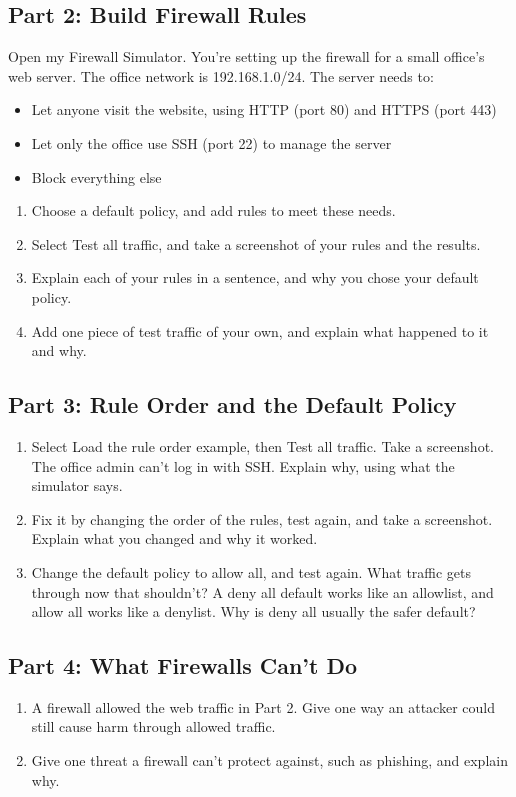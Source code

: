 \documentclass[12pt]{article}
\begin{document}
\subsection*{Part 2: Build Firewall Rules}
Open my Firewall Simulator. You're setting up the firewall for a small office's web server. The office network is 192.168.1.0/24. The server needs to:
\begin{itemize}
    \item Let anyone visit the website, using HTTP (port 80) and HTTPS (port 443)
    \item Let only the office use SSH (port 22) to manage the server
    \item Block everything else
\end{itemize}
\begin{enumerate}[start=8]
    \item Choose a default policy, and add rules to meet these needs.
    \item Select Test all traffic, and take a screenshot of your rules and the results.
    \item Explain each of your rules in a sentence, and why you chose your default policy.
    \item Add one piece of test traffic of your own, and explain what happened to it and why.
\end{enumerate}

\subsection*{Part 3: Rule Order and the Default Policy}
\begin{enumerate}[start=12]
    \item Select Load the rule order example, then Test all traffic. Take a screenshot. The office admin can't log in with SSH. Explain why, using what the simulator says.
    \item Fix it by changing the order of the rules, test again, and take a screenshot. Explain what you changed and why it worked.
    \item Change the default policy to allow all, and test again. What traffic gets through now that shouldn't? A deny all default works like an allowlist, and allow all works like a denylist. Why is deny all usually the safer default?
\end{enumerate}

\subsection*{Part 4: What Firewalls Can't Do}
\begin{enumerate}[start=15]
    \item A firewall allowed the web traffic in Part 2. Give one way an attacker could still cause harm through allowed traffic.
    \item Give one threat a firewall can't protect against, such as phishing, and explain why.
\end{enumerate}
\end{document}
